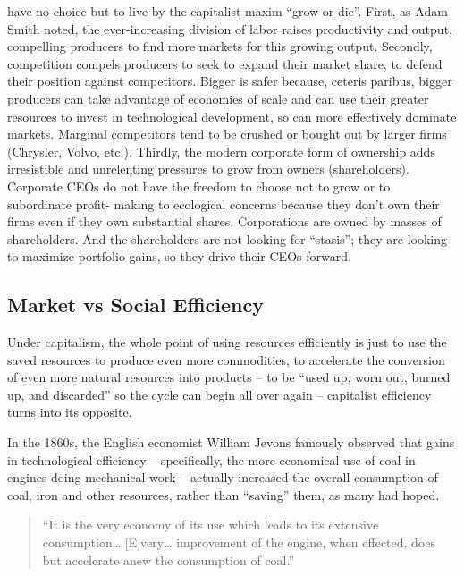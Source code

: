 \documentclass[
]{book}
\begin{document}
\begin{enumerate}
  have no choice but to live by the capitalist maxim ``grow or die''. First, as Adam
  Smith noted, the ever-increasing division of labor raises productivity and output,
  compelling producers to find more markets for this growing output. Secondly,
  competition compels producers to seek to expand their market share, to defend their
  position against competitors. Bigger is safer because, ceteris paribus, bigger
  producers can take advantage of economies of scale and can use their greater
  resources to invest in technological development, so can more effectively dominate
  markets. Marginal competitors tend to be crushed or bought out by larger firms
  (Chrysler, Volvo, etc.). Thirdly, the modern corporate form of ownership adds
  irresistible and unrelenting pressures to grow from owners (shareholders). Corporate
  CEOs do not have the freedom to choose not to grow or to subordinate profit-
  making to ecological concerns because they don't own their firms even if they own
  substantial shares. Corporations are owned by masses of shareholders. And the
  shareholders are not looking for ``stasis''; they are looking to maximize portfolio
  gains, so they drive their CEOs forward.
\end{enumerate}

\hypertarget{market-vs-social-efficiency}{%
\subsection{Market vs Social Efficiency}\label{market-vs-social-efficiency}}

Under capitalism, the whole point of
using resources efficiently is just to use the saved resources to produce even more
commodities, to accelerate the conversion of even more natural resources into
products -- to be ``used up, worn out, burned up, and discarded'' so the cycle can
begin all over again -- capitalist efficiency turns into its opposite.

In the 1860s, the
English economist William Jevons famously observed that gains in technological
efficiency -- specifically, the more economical use of coal in engines doing
mechanical work -- actually increased the overall consumption of coal, iron and
other resources, rather than ``saving'' them, as many had hoped.

\begin{quote}
``It is the very economy of its use which leads to its extensive
consumption\ldots{} {[}E{]}very\ldots{} improvement of the engine, when
effected, does but accelerate anew the consumption of coal.''
\end{quote}
\end{document}
